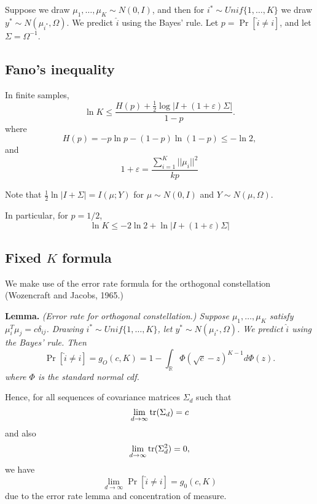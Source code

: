 \documentclass[12pt]{article}
\begin{document}
Suppose we draw $\mu_1,\hdots,\mu_K \sim N(0, I)$, and then
for $i^* \sim Unif\{1,\hdots, K\}$ we draw $y^* \sim N(\mu_{i^*}, \Omega)$.
We predict $\hat{i}$ using the Bayes' rule.  Let $p = \Pr[\hat{i} \neq i]$,
and let $\Sigma = \Omega^{-1}$.

\subsection{Fano's inequality}
In finite samples,
\[
\ln K \leq \frac{H(p) + \frac{1}{2}\log |I + (1+\varepsilon)\Sigma|}{1-p}.
\]
where
\[
H(p) = -p\ln p - (1-p) \ln (1-p) \leq - \ln 2,
\]
and
\[
1 + \varepsilon = \frac{\sum_{i=1}^K ||\mu_i||^2}{kp}
\]

Note that $\frac{1}{2}\ln|I + \Sigma| = I(\mu; Y)$ for $\mu \sim N(0, I)$ and $Y \sim N(\mu, \Omega)$.

In particular, for $p=1/2$,
\[
\ln K \leq -2\ln 2 + \ln |I + (1+\varepsilon)\Sigma|
\]

\subsection{Fixed $K$ formula}

We make use of the error rate formula for the orthogonal constellation (Wozencraft and Jacobs, 1965.)

\noindent\textbf{Lemma.} \emph{
(Error rate for orthogonal constellation.)
Suppose $\mu_1, \hdots, \mu_K$ satisfy $\mu_i^T\mu_j = c\delta_{ij}$.
Drawing $i^* \sim Unif\{1,\hdots, K\}$, let $y^* \sim N(\mu_{i^*}, \Omega)$.
We predict $\hat{i}$ using the Bayes' rule.  Then 
\[
\Pr[\hat{i} \neq i] = g_O(c, K) = 1 - \int_{\mathbb{R}} \Phi(\sqrt{c} - z)^{K-1} d\Phi(z).
\]
where $\Phi$ is the standard normal cdf.
}

Hence, for all sequences of covariance matrices $\Sigma_d$ such that 
$$\lim_{d \to \infty} \text{tr}( \Sigma_d )= c$$
and also 
$$\lim_{d \to \infty} \text{tr}( \Sigma_d^2 )= 0,$$
we have
\[
\lim_{d \to \infty} \Pr[\hat{i} \neq i] = g_0(c, K)
\]
due to the error rate lemma and concentration of measure.
\end{document}
